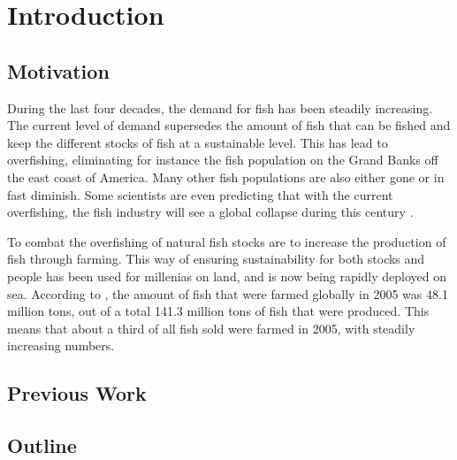 
\chapter{Introduction}




\section{Motivation}
During the last four decades, the demand for fish 
has been steadily increasing. The current level 
of demand supersedes the amount of fish that 
can be fished and keep the different stocks of 
fish at a sustainable level. This has lead to 
overfishing, eliminating for instance the 
fish population on the Grand Banks off the east 
coast of America. Many other fish 
populations are also either gone or in fast 
diminish. Some scientists are even predicting 
that with the current overfishing, the fish industry will 
see a global collapse during this century \citet{worm06}.

To combat the overfishing of natural fish stocks are to increase 
the production of fish through farming. This way of ensuring 
sustainability for both stocks and people has been 
used for millenias on land, and is now being rapidly 
deployed on sea. According to \citet{fao06}, the amount of 
fish that were farmed globally in 2005 was 48.1 million tons, out of 
a total 141.3 million tons of fish that were produced. This 
means that about a third of all fish sold were farmed in 2005, with 
steadily increasing numbers.

\section{Previous Work}


\section{Outline}

